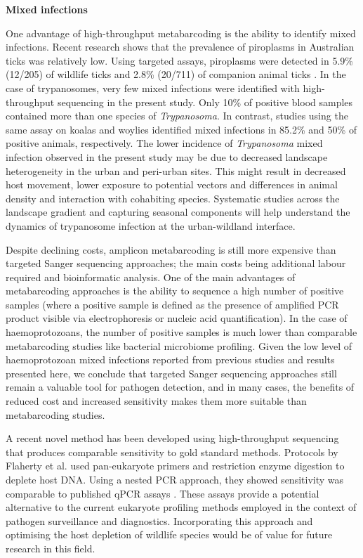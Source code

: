 \documentclass[a4paper, nobind]{templates/ociamthesis}
\begin{document}
\textbf{Mixed infections}

One advantage of high-throughput metabarcoding is the ability to identify mixed infections. Recent research shows that the prevalence of piroplasms in Australian ticks was relatively low.
Using targeted assays, piroplasms were detected in 5.9\% (12/205) of wildlife ticks \autocite{lohMolecularSurveillancePiroplasms2018} and 2.8\% (20/711) of companion animal ticks \autocite{greayEndemicExoticNovel2018}.
In the case of trypanosomes, very few mixed infections were identified with high-throughput sequencing in the present study.
Only 10\% of positive blood samples contained more than one species of \emph{Trypanosoma}.
In contrast, studies using the same assay on koalas and woylies identified mixed infections in 85.2\% \autocite{barbosaIncreasedGeneticDiversity2017} and 50\% \autocite{cooperNextGenerationSequencing2018} of positive animals, respectively.
The lower incidence of \emph{Trypanosoma} mixed infection observed in the present study may be due to decreased landscape heterogeneity in the urban and peri-urban sites.
This might result in decreased host movement, lower exposure to potential vectors and differences in animal density and interaction with cohabiting species.
Systematic studies across the landscape gradient and capturing seasonal components will help understand the dynamics of trypanosome infection at the urban-wildland interface.

Despite declining costs, amplicon metabarcoding is still more expensive than targeted Sanger sequencing approaches; the main costs being additional labour required and bioinformatic analysis.
One of the main advantages of metabarcoding approaches is the ability to sequence a high number of positive samples (where a positive sample is defined as the presence of amplified PCR product visible via electrophoresis or nucleic acid quantification).
In the case of haemoprotozoans, the number of positive samples is much lower than comparable metabarcoding studies like bacterial microbiome profiling.
Given the low level of haemoprotozoan mixed infections reported from previous studies \autocite{hugginsNovelMetabarcodingDiagnostic2019} and results presented here, we conclude that targeted Sanger sequencing approaches still remain a valuable tool for pathogen detection, and in many cases, the benefits of reduced cost and increased sensitivity makes them more suitable than metabarcoding studies.

A recent novel method has been developed using high-throughput sequencing that produces comparable sensitivity to gold standard methods. Protocols by Flaherty et al. \autocite*{flahertyRestrictionEnzymeDigestion2018,flahertySensitiveUniversalDetection2021} used pan-eukaryote primers and restriction enzyme digestion to deplete host DNA. Using a nested PCR approach, they showed sensitivity was comparable to published qPCR assays \autocite{flahertySensitiveUniversalDetection2021}.
These assays provide a potential alternative to the current eukaryote profiling methods employed in the context of pathogen surveillance and diagnostics.
Incorporating this approach and optimising the host depletion of wildlife species would be of value for future research in this field.
\end{document}
